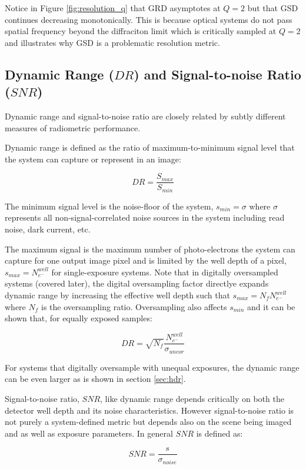 \documentclass[10pt,journal]{IEEEtran}  %
\begin{document}
Notice in Figure \ref{fig:resolution_q} that GRD asymptotes at $Q=2$ but that GSD continues decreasing monotonically.  This is because optical systems do not pass spatial frequency beyond the diffraciton limit which is critically sampled at $Q=2$ and illustrates why GSD is a problematic resolution metric.

\subsection{Dynamic Range ($DR$) and Signal-to-noise Ratio ($SNR$)}
Dynamic range and signal-to-noise ratio are closely related by subtly different measures of radiometric performance.

Dynamic range is defined as the ratio of maximum-to-minimum signal level that the system can capture or represent in an image:

$$DR = \frac{S_{max}}{S_{min}}$$

The minimum signal level is the noise-floor of the system, $s_{min} = \sigma$ where $\sigma$ represents all non-signal-correlated noise sources in the system including read noise, dark current, etc.

The maximum signal is the maximum number of photo-electrons the system can capture for one output image pixel and is limited by the well depth of a pixel, $s_{max} = N_{e^-}^{well}$ for single-exposure systems.  Note that in digitally oversampled systems (covered later), the digital oversampling factor directlye expands dynamic range by increasing the effective well depth such that $s_{max} = N_f N_{e^-}^{well}$ where $N_f$ is the oversampling ratio.  Oversampling also affects $s_{min}$ and it can be shown that, for equally exposed samples:

\begin{equation}
    DR = \sqrt{N_f}\frac{N_{e^-}^{well}}{\sigma_{uncor}}
\label{eq:DR_OS}
\end{equation}

For systems that digitally oversample with unequal exposures, the dynamic range can be even larger as is shown in section \ref{sec:hdr}.

Signal-to-noise ratio, $SNR$, like dynamic range depends critically on both the detector well depth and its noise characteristics.  However signal-to-noise ratio is not purely a system-defined metric but depends also on the scene being imaged and as well as exposure parameters.  In general $SNR$ is defined as:

$$SNR = \frac{s}{\sigma_{noise}}$$
\end{document}
